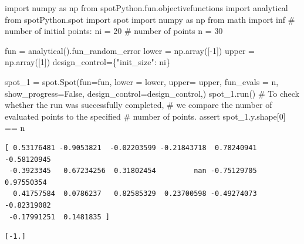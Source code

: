 \documentclass[
  letterpaper,
  DIV=11,
  numbers=noendperiod]{scrreprt}
\newenvironment{Shaded}{\begin{snugshade}}{\end{snugshade}}
\newcommand{\CommentTok}[1]{\textcolor[rgb]{0.37,0.37,0.37}{#1}}
\newcommand{\ControlFlowTok}[1]{\textcolor[rgb]{0.00,0.23,0.31}{#1}}
\newcommand{\DecValTok}[1]{\textcolor[rgb]{0.68,0.00,0.00}{#1}}
\newcommand{\ImportTok}[1]{\textcolor[rgb]{0.00,0.46,0.62}{#1}}
\newcommand{\NormalTok}[1]{\textcolor[rgb]{0.00,0.23,0.31}{#1}}
\newcommand{\OperatorTok}[1]{\textcolor[rgb]{0.37,0.37,0.37}{#1}}
\newcommand{\StringTok}[1]{\textcolor[rgb]{0.13,0.47,0.30}{#1}}
\newcommand{\VariableTok}[1]{\textcolor[rgb]{0.07,0.07,0.07}{#1}}
\begin{document}
\begin{Shaded}
\begin{Highlighting}[]
\ImportTok{import}\NormalTok{ numpy }\ImportTok{as}\NormalTok{ np}
\ImportTok{from}\NormalTok{ spotPython.fun.objectivefunctions }\ImportTok{import}\NormalTok{ analytical}
\ImportTok{from}\NormalTok{ spotPython.spot }\ImportTok{import}\NormalTok{ spot}
\ImportTok{import}\NormalTok{ numpy }\ImportTok{as}\NormalTok{ np}
\ImportTok{from}\NormalTok{ math }\ImportTok{import}\NormalTok{ inf}
\CommentTok{\# number of initial points:}
\NormalTok{ni }\OperatorTok{=} \DecValTok{20}
\CommentTok{\# number of points}
\NormalTok{n }\OperatorTok{=} \DecValTok{30}

\NormalTok{fun }\OperatorTok{=}\NormalTok{ analytical().fun\_random\_error}
\NormalTok{lower }\OperatorTok{=}\NormalTok{ np.array([}\OperatorTok{{-}}\DecValTok{1}\NormalTok{])}
\NormalTok{upper }\OperatorTok{=}\NormalTok{ np.array([}\DecValTok{1}\NormalTok{])}
\NormalTok{design\_control}\OperatorTok{=}\NormalTok{\{}\StringTok{"init\_size"}\NormalTok{: ni\}}

\NormalTok{spot\_1 }\OperatorTok{=}\NormalTok{ spot.Spot(fun}\OperatorTok{=}\NormalTok{fun,}
\NormalTok{            lower }\OperatorTok{=}\NormalTok{ lower,}
\NormalTok{            upper}\OperatorTok{=}\NormalTok{ upper,}
\NormalTok{            fun\_evals }\OperatorTok{=}\NormalTok{ n,}
\NormalTok{            show\_progress}\OperatorTok{=}\VariableTok{False}\NormalTok{,}
\NormalTok{            design\_control}\OperatorTok{=}\NormalTok{design\_control,)}
\NormalTok{spot\_1.run()}
\CommentTok{\# To check whether the run was successfully completed,}
\CommentTok{\# we compare the number of evaluated points to the specified}
\CommentTok{\# number of points.}
\ControlFlowTok{assert}\NormalTok{ spot\_1.y.shape[}\DecValTok{0}\NormalTok{] }\OperatorTok{==}\NormalTok{ n}
\end{Highlighting}
\end{Shaded}

\begin{verbatim}
[ 0.53176481 -0.9053821  -0.02203599 -0.21843718  0.78240941 -0.58120945
 -0.3923345   0.67234256  0.31802454         nan -0.75129705  0.97550354
  0.41757584  0.0786237   0.82585329  0.23700598 -0.49274073 -0.82319082
 -0.17991251  0.1481835 ]
\end{verbatim}

\begin{verbatim}
[-1.]
\end{verbatim}

\begin{verbatim}
\end{verbatim}
\end{document}
